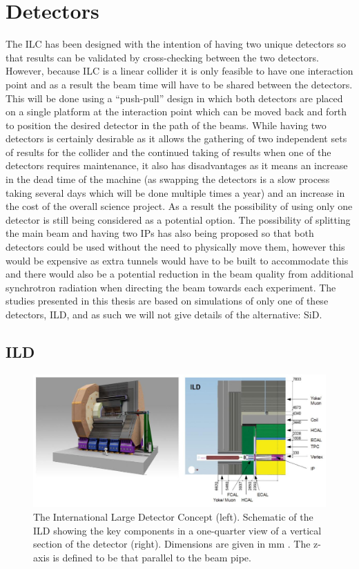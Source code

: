 \section{Detectors}
The \ac{ILC} has been designed with the intention of having two unique detectors so that results can be validated by cross-checking between the two detectors. However, because \ac{ILC} is a linear collider it is only feasible to have one interaction point and as a result the beam time will have to be shared between the detectors. This will be done using a ``push-pull'' design in which both detectors are placed on a single platform at the interaction point which can be moved back and forth to position the desired detector in the path of the beams. While having two detectors is certainly desirable as it allows the gathering of two independent sets of results for the collider and the continued taking of results when one of the detectors requires maintenance, it also has disadvantages as it means an increase in the dead time of the machine (as swapping the detectors is a slow process taking several days which will be done multiple times a year) and an increase in the cost of the overall science project. As a result the possibility of using only one detector is still being considered as a potential option. The possibility of splitting the main beam and having two IPs has also being proposed so that both detectors could be used without the need to physically move them, however this would be expensive as extra tunnels would have to be built to accommodate this and there would also be a potential reduction in the beam quality from additional synchrotron radiation when directing the beam towards each experiment. The studies presented in this thesis are based on simulations of only one of these detectors, \ac{ILD}\cite{ILD}, and as such we will not give details of the alternative: \ac{SiD}\cite{Aihara:2009ad}. 

\subsection{ILD}
\begin{figure}
  \centering
  \includegraphics[width=1.0\textwidth,keepaspectratio]{Experiments/fig/ILD}
  \caption[ILD Detector]{The International Large Detector Concept (left). Schematic of the ILD showing the key components in a one-quarter view of a vertical section of the detector (right). Dimensions are given in mm \cite{ILCTDR}. The z-axis is defined to be that parallel to the beam pipe.}
  \label{Fig:ILD}
\end{figure}

